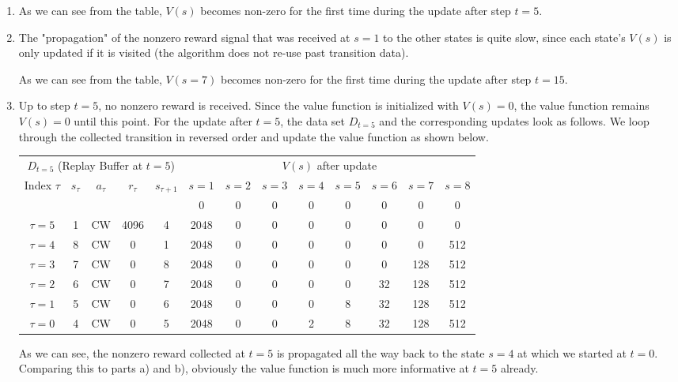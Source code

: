 \begin{solution}
\begin{enumerate}
\item
As we can see from the table, $V(s)$ becomes non-zero for the first time during the update after step $t=5$.

\item
The "propagation" of the nonzero reward signal that was received at $s=1$ to the other states is quite slow, since each state's $V(s)$ is only updated if it is visited (the algorithm does not re-use past transition data).

As we can see from the table, $V(s=7)$ becomes non-zero for the first time during the update after step $t=15$.

\item
Up to step $t=5$, no nonzero reward is received. Since the value function is initialized with $V(s)=0$, the value function remains $V(s)=0$ until this point.
For the update after $t=5$, the data set $D_{t=5}$ and the corresponding updates look as follows. We loop through the collected transition in reversed order and update the value function as shown below.
\begin{center}
    \begin{tabular}{ccccc|cccccccc}
        \multicolumn{5}{c}{ $D_{t=5}$ (Replay Buffer at $t=5$) } & \multicolumn{8}{c}{ $V(s)$ after update } \\
        Index $\tau$ & $s_\tau$ & $a_\tau$ & $r_\tau$ & $s_{\tau+1}$ & $s=1$ & $s=2$ & $s=3$ & $s=4$ & $s=5$ & $s=6$ & $s=7$ & $s=8$ \\
        \hline
        & & & & & 0 & 0 & 0 & 0 & 0 & 0 & 0 & 0 \\
        $\tau = 5$ & 1 & CW & 4096 & 4 & 2048 & 0 & 0 & 0 & 0 & 0 & 0 & 0 \\
        $\tau = 4$ & 8 & CW & 0 & 1 & 2048 & 0 & 0 & 0 & 0 & 0 & 0 & 512 \\
        $\tau = 3$ & 7 & CW & 0 & 8 & 2048 & 0 & 0 & 0 & 0 & 0 & 128 & 512 \\
        $\tau = 2$ & 6 & CW & 0 & 7 & 2048 & 0 & 0 & 0 & 0 & 32 & 128 & 512 \\
        $\tau = 1$ & 5 & CW & 0 & 6 & 2048 & 0 & 0 & 0 & 8 & 32 & 128 & 512 \\
        $\tau = 0$ & 4 & CW & 0 & 5 & 2048 & 0 & 0 & 2 & 8 & 32 & 128 & 512 \\
    \end{tabular}        
\end{center}
As we can see, the nonzero reward collected at $t=5$ is propagated all the way back to the state $s=4$ at which we started at $t=0$. Comparing this to parts a) and b), obviously the value function is much more informative at $t=5$ already.


\end{enumerate}
\end{solution}
